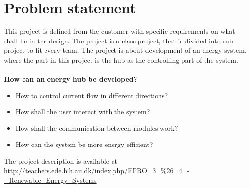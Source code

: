 \chapter{Problem statement}
This project is defined from the customer with specific requirements on what shall be in the design. The project is a class project, that is divided into sub-project to fit every team. The project is about development of an energy system, where the part in this project is the hub as the controlling part of the system.\\
\\
\textbf{How can an energy hub be developed?}
\begin{itemize}
\item How to control current flow in different directions?\\
\item How shall the user interact with the system?\\
\item How shall the communication between modules work?\\
\item How can the system be more energy efficient?\\
\end{itemize}
The project description is available at \url{http://teachers.ede.hih.au.dk/index.php/EPRO_3_%26_4_-_Renewable_Energy_Systems}

